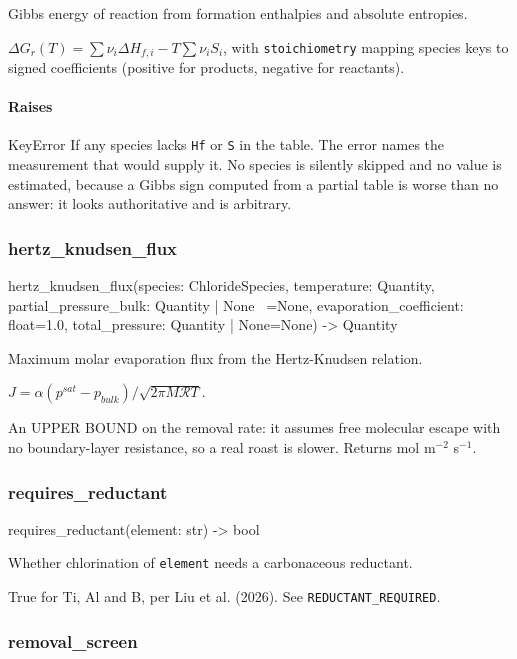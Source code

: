 \documentclass[10pt,a4paper,twoside]{report}
\begin{document}
Gibbs energy of reaction from formation enthalpies and absolute entropies.

$\Delta G_r(T) = \sum \nu_i \Delta H_{f,i} - T\sum \nu_i S_i$, with \texttt{stoichiometry} mapping species keys to signed coefficients (positive for products, negative for reactants).

\paragraph*{Raises}

KeyError If any species lacks \texttt{Hf} or \texttt{S} in the table. The error names the measurement that would supply it. No species is silently skipped and no value is estimated, because a Gibbs sign computed from a partial table is worse than no answer: it looks authoritative and is arbitrary.

\subsubsection*{hertz\_knudsen\_flux}

\begin{verbatimsmall}
hertz_knudsen_flux(species: ChlorideSpecies, temperature: Quantity, partial_pressure_bulk: Quantity | None
    \ =None, evaporation_coefficient: float=1.0, total_pressure: Quantity | None=None) -> Quantity
\end{verbatimsmall}

Maximum molar evaporation flux from the Hertz-Knudsen relation.

$J = \alpha (p^{sat}-p_{bulk}) / \sqrt{2\pi M \mathcal{R} T}$.

An UPPER BOUND on the removal rate: it assumes free molecular escape with no boundary-layer resistance, so a real roast is slower. Returns mol m$^{-2}$ s$^{-1}$.

\subsubsection*{requires\_reductant}

\begin{verbatimsmall}
requires_reductant(element: str) -> bool
\end{verbatimsmall}

Whether chlorination of \texttt{element} needs a carbonaceous reductant.

True for Ti, Al and B, per Liu et al. (2026). See \texttt{REDUCTANT\_REQUIRED}.

\subsubsection*{removal\_screen}
\end{document}
